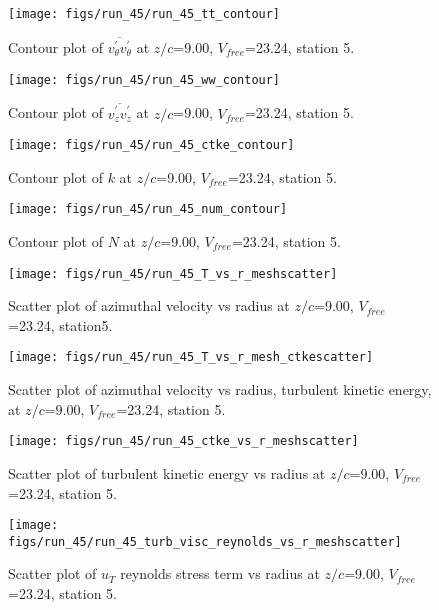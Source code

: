 \begin{figure}[H]
\centering
\texttt{[image: figs/run\_45/run\_45\_tt\_contour]}
\caption{Contour plot of $\overline{v_{\theta}^{\prime} v_{\theta}^{\prime}}$ at $z/c$=9.00, $V_{free}$=23.24, station 5.}
\end{figure}


\begin{figure}[H]
\centering
\texttt{[image: figs/run\_45/run\_45\_ww\_contour]}
\caption{Contour plot of $\overline{v_{z}^{\prime} v_{z}^{\prime}}$ at $z/c$=9.00, $V_{free}$=23.24, station 5.}
\end{figure}


\begin{figure}[H]
\centering
\texttt{[image: figs/run\_45/run\_45\_ctke\_contour]}
\caption{Contour plot of $k$ at $z/c$=9.00, $V_{free}$=23.24, station 5.}
\end{figure}


\begin{figure}[H]
\centering
\texttt{[image: figs/run\_45/run\_45\_num\_contour]}
\caption{Contour plot of $N$ at $z/c$=9.00, $V_{free}$=23.24, station 5.}
\end{figure}


\begin{figure}[H]
\centering
\texttt{[image: figs/run\_45/run\_45\_T\_vs\_r\_meshscatter]}
\caption{Scatter plot of azimuthal velocity vs radius at $z/c$=9.00, $V_{free}$=23.24, station5.}
\end{figure}


\begin{figure}[H]
\centering
\texttt{[image: figs/run\_45/run\_45\_T\_vs\_r\_mesh\_ctkescatter]}
\caption{Scatter plot of azimuthal velocity vs radius, turbulent kinetic energy, at $z/c$=9.00, $V_{free}$=23.24, station 5.}
\end{figure}


\begin{figure}[H]
\centering
\texttt{[image: figs/run\_45/run\_45\_ctke\_vs\_r\_meshscatter]}
\caption{Scatter plot of turbulent kinetic energy vs radius at $z/c$=9.00, $V_{free}$=23.24, station 5.}
\end{figure}


\begin{figure}[H]
\centering
\texttt{[image: figs/run\_45/run\_45\_turb\_visc\_reynolds\_vs\_r\_meshscatter]}
\caption{Scatter plot of $
u_T$ reynolds stress term vs radius at $z/c$=9.00, $V_{free}$=23.24, station 5.}
\end{figure}


